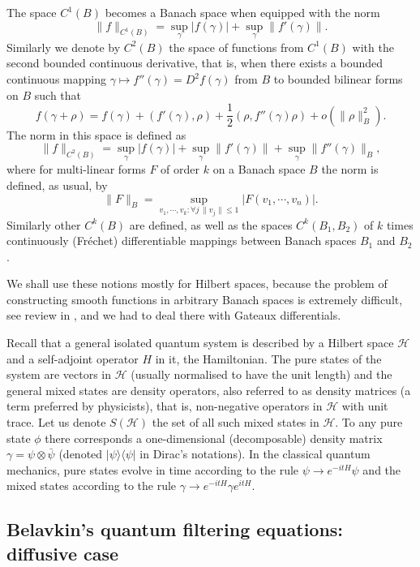 \documentclass[12pt]{article}
\def\HC{\mathcal{H}}
\def\ga{\gamma}
\begin{document}
The space $C^1(B)$ becomes a Banach space when equipped with the norm
\[
\|f\|_{C^1(B)}=\sup_{\ga} |f(\ga)|+\sup_{\ga} \|f'(\ga)\|.
\]
Similarly we denote by $C^2(B)$ the space of functions from
$C^1(B)$ with the second bounded continuous derivative, that is, when
there exists a bounded continuous mapping $\ga \mapsto f''(\ga)=D^2f(\ga)$ from $B$
to bounded bilinear forms on $B$ such that
\[
f(\ga+\rho)=f(\ga)+(f'(\ga), \rho)+\frac12 (\rho, f''(\ga) \rho) +o(\|\rho\|^2_B).
\]
The norm in this space is defined as
\[
\|f\|_{C^2(B)}=\sup_{\ga} |f(\ga)|+\sup_{\ga} \|f'(\ga)\|+\sup_{\ga}\|f''(\ga)\|_{B},
\]
where for multi-linear forms $F$ of order $k$ on
a Banach space $B$ the norm is defined, as usual, by
\[
\|F\|_B=\sup_{v_1, \cdots, v_k: \forall j \, \|v_j\|\le 1} |F(v_1, \cdots, v_n)|.
\]
Similarly other $C^k(B)$ are defined, as well as the spaces
$C^k(B_1,B_2)$ of $k$ times continuously (Fr\'echet) differentiable mappings
between Banach spaces $B_1$ and $B_2$.

We shall use these notions mostly for Hilbert spaces,
because the problem of constructing smooth functions in
arbitrary Banach spaces is extremely difficult, see review in \cite{Toolbox},
and we had to deal there with Gateaux differentials.


Recall that a general isolated quantum system is described by
a Hilbert space $\HC$ and a self-adjoint operator $H$ in it,
the Hamiltonian. The pure states of the system are vectors in $\HC$
(usually normalised to have the unit length) and the general mixed states are density
operators, also referred to as density matrices (a term preferred by physicists),
that is, non-negative operators in $\HC$ with unit trace.
Let us denote $S(\HC)$ the set of all such mixed states in $\HC$.
 To any pure state $\phi$ there corresponds a one-dimensional (decomposable) density matrix
  $\ga=\psi\otimes \bar \psi$ (denoted $|\psi \rangle \langle \psi|$ in Dirac's notations).
In the classical quantum mechanics, pure states evolve in time according to the rule $\psi \to e^{-itH} \psi$
and the mixed states according to the rule  $\ga \to e^{-itH} \ga e^{itH}$.

\subsection{Belavkin's quantum filtering equations: diffusive case}
\end{document}
